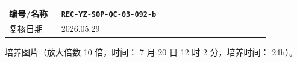 \documentclass[UTF8,10pt,a4paper,fontset=fandol]{ctexart}
\newcommand{\fieldvalue}[1]{#1}
\newcommand{\handwritten}[1]{#1}
\begin{document}
\begin{tabular}{|p{0.18\linewidth}|p{0.72\linewidth}|}
\hline
编号/名称 &
\fieldvalue{\texttt{REC-YZ-SOP-QC-03-092-b}} \\
\hline
复核日期 &
\fieldvalue{\handwritten{2026.05.29}} \\
\hline
\end{tabular}

\vspace{0.5em}

培养图片（放大倍数
\fieldvalue{\handwritten{10}}
倍，时间：
\fieldvalue{\handwritten{7}}
月
\fieldvalue{\handwritten{20}}
日
\fieldvalue{\handwritten{12}}
时
\fieldvalue{\handwritten{2}}
分，培养时间：
\fieldvalue{\handwritten{24h}}）。

\vspace{0.5em}

\begin{center}
\fbox{\rule{0pt}{0.25\linewidth}\rule{0.75\linewidth}{0pt}}
\end{center}
\end{document}

